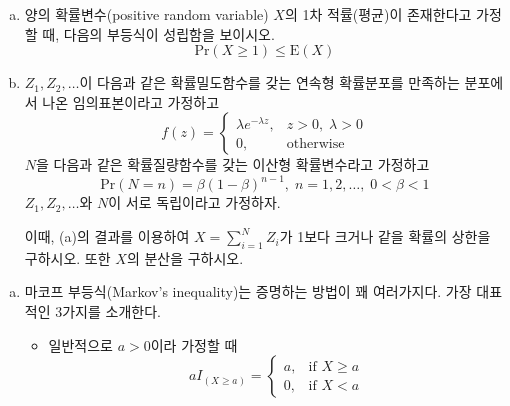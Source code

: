 \documentclass[answers]{exam}
\begin{document}
\newpage
{}
\begin{questions}
   \question
   \begin{enumerate}[(a)]
    \item 양의 확률변수(positive random variable) $X$의 1차 적률(평균)이 존재한다고 가정할 때, 다음의 부등식이 성립함을 보이시오.
    \begin{equation}
      \mathrm{Pr}\left(X\geq 1\right) \leq \mathrm{E}\left(X\right)
    \end{equation}
    \item $Z_{1},Z_{2},\ldots$이 다음과 같은 확률밀도함수를 갖는 연속형 확률분포를 만족하는 분포에서 나온 임의표본이라고 가정하고
    \begin{equation}
      f\left(z\right) = \begin{cases}\lambda e^{-\lambda z},& z>0,\;\lambda>0 \\ 0, & \text{otherwise}  \end{cases}
    \end{equation}
    $N$을 다음과 같은 확률질량함수를 갖는 이산형 확률변수라고 가정하고
    \begin{equation}
      \mathrm{Pr}\left(N=n\right)=\beta\left(1-\beta\right)^{n-1},\; n=1,2,\ldots,\; 0<\beta<1
    \end{equation}
    $Z_{1},Z_{2},\ldots$와 $N$이 서로 독립이라고 가정하자.\par
    이때, (a)의 결과를 이용하여 $X=\displaystyle \sum_{i=1}^{N}Z_{i}$가 1보다 크거나 같을 확률의 상한을 구하시오. 또한 $X$의 분산을 구하시오.
    \end{enumerate}
    \begin{solution}
      \begin{enumerate}[(a)]
        \item 마코프 부등식(Markov's inequality)는 증명하는 방법이 꽤 여러가지다. 가장 대표적인 3가지를 소개한다.
        \begin{itemize}
          \item 일반적으로 $a > 0$이라 가정할 때
          \begin{equation}
            aI_{\left(X\geq a\right)}=\begin{cases}a, & \text{if $X\geq a$}\\ 0, & \text{if $X < a$}\end{cases}

\end{equation}
\end{itemize}
\end{enumerate}
\end{solution}
\end{questions}
\end{document}
